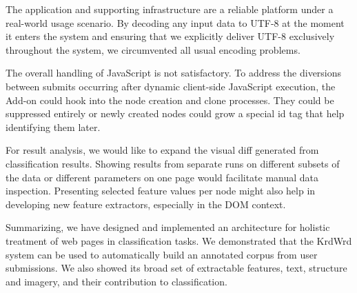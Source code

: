 The {\KrdWrd} application and supporting infrastructure are a reliable platform under a real-world usage scenario.
By decoding any input data to UTF-8 at the moment it enters the system and ensuring that we explicitly deliver UTF-8 exclusively throughout the system, we circumvented all usual encoding problems.


The overall handling of JavaScript is not satisfactory.
To address the diversions between submits occurring after dynamic client-side JavaScript execution, the Add-on could hook into the node creation and clone processes.
They could be suppressed entirely or newly created nodes could grow a special id tag that help identifying them later.

For result analysis, we would like to expand the visual diff generated from classification results.
Showing results from separate runs on different subsets of the data or different parameters on one page would facilitate manual data inspection.
Presenting selected feature values per node might also help in developing new feature extractors, especially in the DOM context.


Summarizing, we have designed and implemented an architecture for holistic treatment of web pages in classification tasks.
We demonstrated that the KrdWrd system can be used to automatically build an annotated corpus from user submissions.
We also showed its broad set of extractable features, text, structure and imagery, and their contribution to classification.

\review{

}

